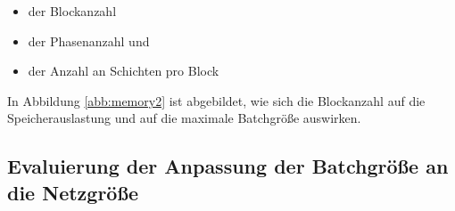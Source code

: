 \begin{itemize}
 \item der Blockanzahl
 \item der Phasenanzahl und
 \item der Anzahl an Schichten pro Block
\end{itemize}
In Abbildung \ref{abb:memory2} ist abgebildet, wie sich die Blockanzahl auf die Speicherauslastung und auf die maximale Batchgröße auswirken.



\subsection{Evaluierung der Anpassung der Batchgröße an die Netzgröße}






